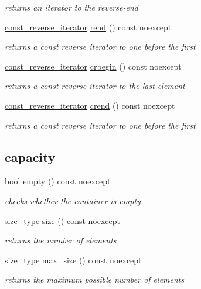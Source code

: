 \begin{DoxyCompactItemize}
\begin{DoxyCompactList}\small\item\em returns an iterator to the reverse-\/end \end{DoxyCompactList}\item 
\hyperlink{classnlohmann_1_1basic__json_ae336fff01f4b78e3e16e5008dc8dbc00}{const\+\_\+reverse\+\_\+iterator} \hyperlink{classnlohmann_1_1basic__json_a36fda9749be288cac96cfd846cb62561}{rend} () const noexcept
\begin{DoxyCompactList}\small\item\em returns a const reverse iterator to one before the first \end{DoxyCompactList}\item 
\hyperlink{classnlohmann_1_1basic__json_ae336fff01f4b78e3e16e5008dc8dbc00}{const\+\_\+reverse\+\_\+iterator} \hyperlink{classnlohmann_1_1basic__json_a060b33f8f255986088652625f9d50681}{crbegin} () const noexcept
\begin{DoxyCompactList}\small\item\em returns a const reverse iterator to the last element \end{DoxyCompactList}\item 
\hyperlink{classnlohmann_1_1basic__json_ae336fff01f4b78e3e16e5008dc8dbc00}{const\+\_\+reverse\+\_\+iterator} \hyperlink{classnlohmann_1_1basic__json_aa7084e62b93ef0236698b246a58bb2da}{crend} () const noexcept
\begin{DoxyCompactList}\small\item\em returns a const reverse iterator to one before the first \end{DoxyCompactList}\end{DoxyCompactItemize}
\subsection*{capacity}
\begin{DoxyCompactItemize}
\item 
bool \hyperlink{classnlohmann_1_1basic__json_ae3fe0423252e171973cdd5786d036e30}{empty} () const noexcept
\begin{DoxyCompactList}\small\item\em checks whether the container is empty \end{DoxyCompactList}\item 
\hyperlink{classnlohmann_1_1basic__json_a1579a8f72a230358d6cd1a6e8a62859b}{size\+\_\+type} \hyperlink{classnlohmann_1_1basic__json_a0ea8a1ecca4b3cb0ba09ad7552c364b6}{size} () const noexcept
\begin{DoxyCompactList}\small\item\em returns the number of elements \end{DoxyCompactList}\item 
\hyperlink{classnlohmann_1_1basic__json_a1579a8f72a230358d6cd1a6e8a62859b}{size\+\_\+type} \hyperlink{classnlohmann_1_1basic__json_a7936417b875b7ec737f77ef84bbf7871}{max\+\_\+size} () const noexcept
\begin{DoxyCompactList}\small\item\em returns the maximum possible number of elements \end{DoxyCompactList}\end{DoxyCompactItemize}
